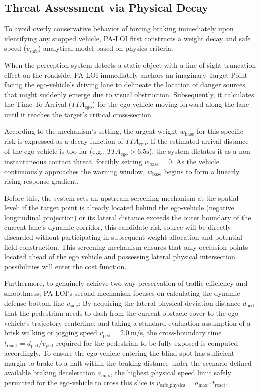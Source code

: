 \documentclass[letterpaper, 10 pt, conference]{ieeeconf}  %
\begin{document}
\subsection{Threat Assessment via Physical Decay}
To avoid overly conservative behavior of forcing braking immediately upon identifying any stopped vehicle, PA-LOI first constructs a weight decay and safe speed ($v_{\text{safe}}$) analytical model based on physics criteria.

When the perception system detects a static object with a line-of-sight truncation effect on the roadside, PA-LOI immediately anchors an imaginary Target Point facing the ego-vehicle's driving lane to delineate the location of danger sources that might suddenly emerge due to visual obstruction. Subsequently, it calculates the Time-To-Arrival ($TTA_{\text{ego}}$) for the ego-vehicle moving forward along the lane until it reaches the target's critical cross-section.

According to the mechanism's setting, the urgent weight $w_{\text{base}}$ for this specific risk is expressed as a decay function of $TTA_{\text{ego}}$. If the estimated arrival distance of the ego-vehicle is too far (e.g., $TTA_{\text{ego}} > 6.5\text{s}$), the system dictates it as a non-instantaneous contact threat, forcibly setting $w_{\text{base}} = 0$. As the vehicle continuously approaches the warning window, $w_{\text{base}}$ begins to form a linearly rising response gradient.

Before this, the system sets an upstream screening mechanism at the spatial level: if the target point is already located behind the ego-vehicle (negative longitudinal projection) or its lateral distance exceeds the outer boundary of the current lane's dynamic corridor, this candidate risk source will be directly discarded without participating in subsequent weight allocation and potential field construction. This screening mechanism ensures that only occlusion points located ahead of the ego vehicle and possessing lateral physical intersection possibilities will enter the cost function.

Furthermore, to genuinely achieve two-way preservation of traffic efficiency and smoothness, PA-LOI's second mechanism focuses on calculating the dynamic defense bottom line $v_{\text{safe}}$:
By acquiring the lateral physical deviation distance $d_{\text{ped}}$ that the pedestrian needs to dash from the current obstacle cover to the ego-vehicle's trajectory centerline, and taking a standard evaluation assumption of a brisk walking or jogging speed $v_{\text{ped}} = \SI{2.0}{\meter\per\second}$, the cross-boundary time $t_{\text{react}} = d_{\text{ped}} / v_{\text{ped}}$ required for the pedestrian to be fully exposed is computed accordingly. To ensure the ego-vehicle entering the blind spot has sufficient margin to brake to a halt within the braking distance under the scenario-defined available braking deceleration $a_{\text{max}}$, the highest physical speed limit safely permitted for the ego-vehicle to cross this slice is $v_{\text{safe\_physics}} = a_{\text{max}} \cdot t_{\text{react}}$.
\end{document}
